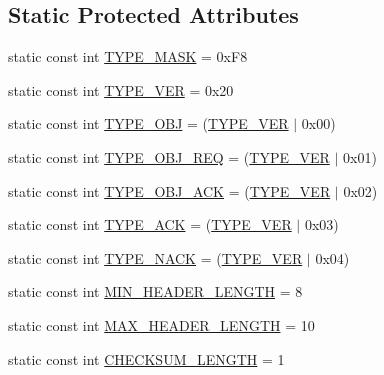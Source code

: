 \subsection*{\-Static \-Protected \-Attributes}
\begin{DoxyCompactItemize}
\item 
static const int \hyperlink{group___u_a_v_talk_plugin_gadad9ea7937a0ef8cf1a162fc2265e9c4}{\-T\-Y\-P\-E\-\_\-\-M\-A\-S\-K} = 0x\-F8
\item 
static const int \hyperlink{group___u_a_v_talk_plugin_gad838c235ec5ef5e1389791d518faa6e7}{\-T\-Y\-P\-E\-\_\-\-V\-E\-R} = 0x20
\item 
static const int \hyperlink{group___u_a_v_talk_plugin_ga160fa827bdb9b5114b132cf644f76d4c}{\-T\-Y\-P\-E\-\_\-\-O\-B\-J} = (\hyperlink{group___u_a_v_talk_plugin_gad838c235ec5ef5e1389791d518faa6e7}{\-T\-Y\-P\-E\-\_\-\-V\-E\-R} $|$ 0x00)
\item 
static const int \hyperlink{group___u_a_v_talk_plugin_ga5e1cb8e2b0aa00f08a16af9c858079e9}{\-T\-Y\-P\-E\-\_\-\-O\-B\-J\-\_\-\-R\-E\-Q} = (\hyperlink{group___u_a_v_talk_plugin_gad838c235ec5ef5e1389791d518faa6e7}{\-T\-Y\-P\-E\-\_\-\-V\-E\-R} $|$ 0x01)
\item 
static const int \hyperlink{group___u_a_v_talk_plugin_gafc2b2ad8c68063a80d64666d0e812572}{\-T\-Y\-P\-E\-\_\-\-O\-B\-J\-\_\-\-A\-C\-K} = (\hyperlink{group___u_a_v_talk_plugin_gad838c235ec5ef5e1389791d518faa6e7}{\-T\-Y\-P\-E\-\_\-\-V\-E\-R} $|$ 0x02)
\item 
static const int \hyperlink{group___u_a_v_talk_plugin_gaec2c5c58b05deb71a40e1248ff82aa52}{\-T\-Y\-P\-E\-\_\-\-A\-C\-K} = (\hyperlink{group___u_a_v_talk_plugin_gad838c235ec5ef5e1389791d518faa6e7}{\-T\-Y\-P\-E\-\_\-\-V\-E\-R} $|$ 0x03)
\item 
static const int \hyperlink{group___u_a_v_talk_plugin_ga809ec3528886e43e38072e2d16787668}{\-T\-Y\-P\-E\-\_\-\-N\-A\-C\-K} = (\hyperlink{group___u_a_v_talk_plugin_gad838c235ec5ef5e1389791d518faa6e7}{\-T\-Y\-P\-E\-\_\-\-V\-E\-R} $|$ 0x04)
\item 
static const int \hyperlink{group___u_a_v_talk_plugin_ga0d20c7ff6e0eedb2ab1243c6bf957fd3}{\-M\-I\-N\-\_\-\-H\-E\-A\-D\-E\-R\-\_\-\-L\-E\-N\-G\-T\-H} = 8
\item 
static const int \hyperlink{group___u_a_v_talk_plugin_ga279763a8abdcb2fae7cb36916b36c1a8}{\-M\-A\-X\-\_\-\-H\-E\-A\-D\-E\-R\-\_\-\-L\-E\-N\-G\-T\-H} = 10
\item 
static const int \hyperlink{group___u_a_v_talk_plugin_ga094abac2d747f187a4b22bea1dd28ec0}{\-C\-H\-E\-C\-K\-S\-U\-M\-\_\-\-L\-E\-N\-G\-T\-H} = 1

\end{DoxyCompactItemize}
